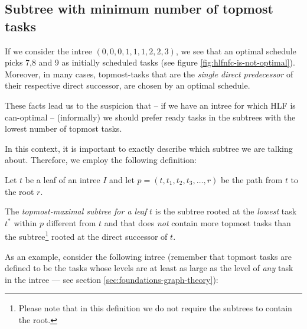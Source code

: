 \subsection{Subtree with minimum number of topmost tasks}
\label{sec:suboptimal-hlf-can-optimal-subtree-fewest-toptasks}

If we consider the intree $(0,0,0,1,1,1,2,2,3)$, we see that an optimal schedule picks 7,8 and 9 as initially scheduled tasks (see figure \ref{fig:hlfnfc-is-not-optimal}). Moreover, in many cases, topmost-tasks that are the \emph{single direct predecessor} of their respective direct successor, are chosen by an optimal schedule.

These facts lead us to the suspicion that -- if we have an intree for which HLF is can-optimal -- (informally) we should prefer ready tasks in the subtrees with the lowest number of topmost tasks. 

In this context, it is important to exactly describe which subtree we are talking about. Therefore, we employ the following definition:

\begin{definition}
  Let $t$ be a leaf of an intree $I$ and let $p=(t, t_1, t_2, t_3, \dots, r)$ be the path from $t$ to the root $r$.

  The \emph{topmost-maximal subtree for a leaf} $t$ is the subtree rooted at the \emph{lowest} task $t^*$ within $p$ different from $t$ and that does \emph{not} contain more topmost tasks than the subtree\footnote{Please note that in this definition we do not require the subtrees to contain the root.} rooted at the direct successor of $t$. %
\end{definition}

As an example, consider the following intree (remember that topmost tasks are defined to be the tasks whose levels are at least as large as the level of \emph{any} task in the intree --- see section \ref{sec:foundations-graph-theory}):

